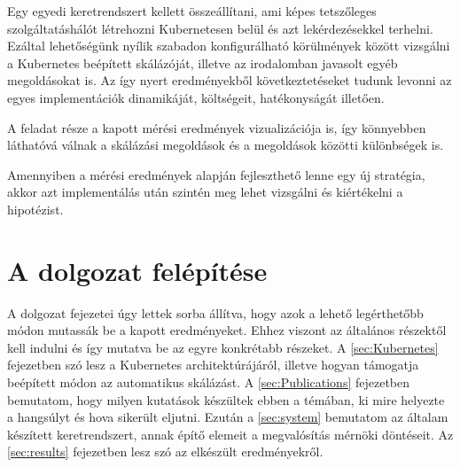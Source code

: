 Egy egyedi keretrendszert kellett összeállítani, ami képes tetszőleges szolgáltatáshálót létrehozni
Kubernetesen belül és azt lekérdezésekkel terhelni. Ezáltal lehetőségünk nyílik szabadon
konfigurálható körülmények között vizsgálni a Kubernetes beépített skálázóját, illetve az
irodalomban javasolt egyéb megoldásokat is. Az így nyert eredményekből következtetéseket tudunk
levonni az egyes implementációk dinamikáját, költségeit, hatékonyságát illetően.

A feladat része a kapott mérési eredmények vizualizációja is, így könnyebben láthatóvá válnak a
skálázási megoldások és a megoldások közötti különbségek is. 

Amennyiben a mérési eredmények alapján fejleszthető lenne egy új stratégia, akkor azt implementálás
után szintén meg lehet vizsgálni és kiértékelni a hipotézist.



\section{A dolgozat felépítése}
A dolgozat fejezetei úgy lettek sorba állítva, hogy azok a lehető legérthetőbb módon mutassák be a kapott eredményeket. Ehhez viszont az általános részektől kell indulni és így mutatva be az egyre konkrétabb részeket. 
A \ref{sec:Kubernetes} fejezetben szó lesz a Kubernetes architektúrájáról, illetve hogyan támogatja beépített módon az automatikus skálázást. 
A \ref{sec:Publications} fejezetben bemutatom, hogy milyen kutatások készültek ebben a témában, ki mire helyezte a hangsúlyt és hova sikerült eljutni.
Ezután a \ref{sec:system} bemutatom az általam készített keretrendszert, annak építő elemeit a megvalósítás mérnöki döntéseit. 
Az \ref{sec:results} fejezetben lesz szó az elkészült eredményekről.
